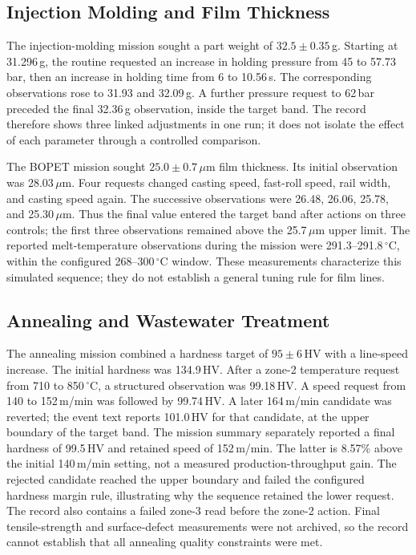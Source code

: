 \subsection{Injection Molding and Film Thickness}
The injection-molding mission sought a part weight of
$32.5\pm0.35$\,g. Starting at 31.296\,g, the routine requested an increase in
holding pressure from 45 to 57.73\,bar, then an increase in holding time from
6 to 10.56\,s. The corresponding observations rose to 31.93 and
32.09\,g. A further pressure request to 62\,bar preceded the final
32.36\,g observation, inside the target band. The record therefore shows
three linked adjustments in one run; it does not isolate the effect of each
parameter through a controlled comparison.

The BOPET mission sought $25.0\pm0.7$\,$\mu$m film thickness. Its initial
observation was 28.03\,$\mu$m. Four requests changed casting speed, fast-roll
speed, rail width, and casting speed again. The successive observations were
26.48, 26.06, 25.78, and 25.30\,$\mu$m. Thus the final value entered the
target band after actions on three controls; the first three observations
remained above the 25.7\,$\mu$m upper limit. The reported melt-temperature
observations during the mission were 291.3--291.8\,$^{\circ}$C, within the
configured 268--300\,$^{\circ}$C window. These measurements characterize
this simulated sequence; they do not establish a general tuning rule for
film lines.

\subsection{Annealing and Wastewater Treatment}
The annealing mission combined a hardness target of $95\pm6$\,HV with a
line-speed increase. The initial hardness was 134.9\,HV. After a zone-2
temperature request from 710 to 850\,$^{\circ}$C, a structured observation
was 99.18\,HV. A speed request from 140 to 152\,m/min was followed by
99.74\,HV. A later 164\,m/min candidate was reverted; the event text reports
101.0\,HV for that candidate, at the upper boundary of the target band.
The mission summary separately reported a final hardness of 99.5\,HV and
retained speed of 152\,m/min. The latter is 8.57\% above the initial
140\,m/min setting, not a measured production-throughput gain. The rejected
candidate reached the upper boundary and failed the configured hardness
margin rule, illustrating why the sequence retained the lower request. The
record also contains a failed zone-3 read
before the zone-2 action. Final tensile-strength and surface-defect
measurements were not archived, so the record cannot establish that all
annealing quality constraints were met.

